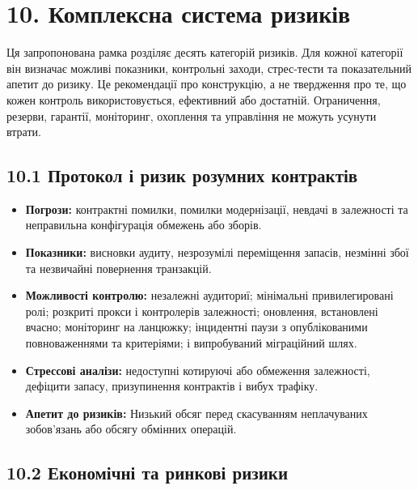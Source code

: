 \documentclass[11pt]{article}
\begin{document}
\section*{10. Комплексна система ризиків}

Ця запропонована рамка розділяє десять категорій ризиків. Для кожної категорії він визначає можливі показники, контрольні заходи, стрес-тести та показательний апетит до ризику. Це рекомендації про конструкцію, а не твердження про те, що кожен контроль використовується, ефективний або достатній. Ограничення, резерви, гарантії, моніторинг, охоплення та управління не можуть усунути втрати.

\subsection*{10.1 Протокол і ризик розумних контрактів}

\begin{itemize}[leftmargin=*]
\item \textbf{Погрози:} контрактні помилки, помилки модернізації, невдачі в залежності та неправильна конфігурація обмежень або зборів.
\item \textbf{Показники:} висновки аудиту, незрозумілі переміщення запасів, незмінні збої та незвичайні повернення транзакцій.
\item \textbf{Можливості контролю:} незалежні аудиториї; мінімальні привилегировані ролі; розкриті прокси і контролерів залежності; оновлення, встановлені вчасно; моніторинг на ланцюжку; інцидентні паузи з опублікованими повноваженнями та критеріями; і випробуваний міграційний шлях.
\item \textbf{Стрессові аналізи:} недоступні котируючі або обмеження залежності, дефіцити запасу, призупинення контрактів і вибух трафіку.
\item \textbf{Апетит до ризиків:} Низький обсяг перед скасуванням неплачуваних зобов'язань або обсягу обмінних операцій.
\end{itemize}
\subsection*{10.2 Економічні та ринкові ризики}
\end{document}

